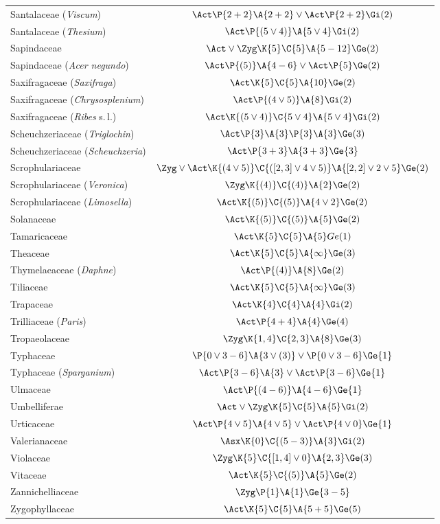 \documentclass[12pt]{article}
\begin{document}
\begin{longtable}{lc}
Santalaceae (\textit{Viscum}) & $\Act\P{2+2}\A{2+2}\vee\Act\P{2+2}\Gi(2)$\\[2pt]
Santalaceae (\textit{Thesium}) & $\Act\P{(5\vee4)}\A{5\vee4}\Gi(2)$\\[2pt]
Sapindaceae & $\Act\vee\Zyg\K{5}\C{5}\A{5-12}\Ge(2)$\\[2pt]
Sapindaceae (\textit{Acer negundo}) & $\Act\P{(5)}\A{4-6}\vee\Act\P{5}\Ge(2)$\\[2pt]
Saxifragaceae (\textit{Saxifraga}) & $\Act\K{5}\C{5}\A{10}\Ge(2)$\\[2pt]
Saxifragaceae (\textit{Chrysosplenium}) & $\Act\P{(4\vee5)}\A{8}\Gi(2)$\\[2pt]
Saxifragaceae (\textit{Ribes} s.\,l.) & $\Act\K{(5\vee4)}\C{5\vee4}\A{5\vee4}\Gi(2)$\\[2pt]
Scheuchzeriaceae (\textit{Triglochin}) & $\Act\P{3}\A{3}\P{3}\A{3}\Ge(3)$\\[2pt]
Scheuchzeriaceae (\textit{Scheuchzeria}) & $\Act\P{3+3}\A{3+3}\Ge{3}$\\[2pt]
Scrophulariaceae & $\Zyg\vee\Act\K{(4\vee5)}\C{([2,3]\vee4\vee5)}\A{[2,2]\vee2\vee5}\Ge(2)$\\[2pt]
Scrophulariaceae (\textit{Veronica}) & $\Zyg\K{(4)}\C{(4)}\A{2}\Ge(2)$\\[2pt]
Scrophulariaceae (\textit{Limosella}) & $\Act\K{(5)}\C{(5)}\A{4\vee2}\Ge(2)$\\[2pt]
Solanaceae & $\Act\K{(5)}\C{(5)}\A{5}\Ge(2)$\\[2pt]
Tamaricaceae & $\Act\K{5}\C{5}\A{5}Ge(1)$\\[2pt]
Theaceae & $\Act\K{5}\C{5}\A{\infty}\Ge(3)$\\[2pt]
Thymelaeaceae (\textit{Daphne}) & $\Act\P{(4)}\A{8}\Ge(2)$\\[2pt]
Tiliaceae & $\Act\K{5}\C{5}\A{\infty}\Ge(3)$\\[2pt]
Trapaceae & $\Act\K{4}\C{4}\A{4}\Gi(2)$\\[2pt]
Trilliaceae (\textit{Paris}) & $\Act\P{4+4}\A{4}\Ge(4)$\\[2pt]
Tropaeolaceae & $\Zyg\K{1,4}\C{2,3}\A{8}\Ge(3)$\\[2pt]
Typhaceae & $\P{0\vee3-6}\A{3\vee(3)}\vee\P{0\vee3-6}\Ge{1}$\\[2pt]
Typhaceae (\textit{Sparganium}) & $\Act\P{3-6}\A{3}\vee\Act\P{3-6}\Ge{1}$\\[2pt]
Ulmaceae & $\Act\P{(4-6)}\A{4-6}\Ge{1}$\\[2pt]
Umbelliferae & $\Act\vee\Zyg\K{5}\C{5}\A{5}\Gi(2)$\\[2pt]
Urticaceae & $\Act\P{4\vee5}\A{4\vee5}\vee\Act\P{4\vee0}\Ge{1}$\\[2pt]
Valerianaceae & $\Asx\K{0}\C{(5-3)}\A{3}\Gi(2)$\\[2pt]
Violaceae & $\Zyg\K{5}\C{[1,4]\vee0}\A{2,3}\Ge(3)$\\[2pt]
Vitaceae & $\Act\K{5}\C{(5)}\A{5}\Ge(2)$\\[2pt]
Zannichelliaceae & $\Zyg\P{1}\A{1}\Ge{3-5}$\\[2pt]
Zygophyllaceae & $\Act\K{5}\C{5}\A{5+5}\Ge(5)$\\[2pt]\hline
\end{longtable}
\end{document}
